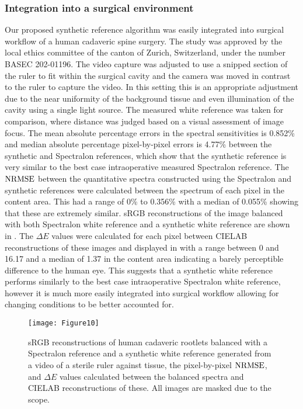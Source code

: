 \FloatBarrier
\subsubsection{Integration into a surgical environment}
\label{resultsintegration}
Our proposed synthetic reference algorithm was easily integrated into surgical workflow of a human cadaveric spine surgery. The study was approved by the local ethics committee of the canton of Zurich, Switzerland, under the number BASEC 202-01196. The video capture was adjusted to use a snipped section of the ruler to fit within the surgical cavity and the camera was moved in contrast to the ruler to capture the video. In this setting this is an appropriate adjustment due to the near uniformity of the background tissue and even illumination of the cavity using a single light source.
The measured white reference was taken for comparison, where distance was judged based on a visual assessment of image focus. The mean absolute percentage errors in the spectral sensitivities is 0.852\% and median absolute percentage pixel-by-pixel errors is 4.77\% between the synthetic and Spectralon references, which show that the synthetic reference is very similar to the best case intraoperative measured Spectralon reference. The $\operatorname{NRMSE}$ between the quantitative spectra constructed using the Spectralon and synthetic references were calculated between the spectrum of each pixel in the content area. This had a range of 0\% to 0.356\% with a median of 0.055\% showing that these are extremely similar. sRGB reconstructions of the image balanced with both Spectralon white reference and a synthetic white reference are shown in . The $\Delta E$ values were calculated for each pixel between CIELAB reconstructions of these images and displayed in  with a range between 0 and 16.17 and a median of 1.37 in the content area indicating a barely perceptible difference to the human eye. This suggests that a synthetic white reference performs similarly to the best case intraoperative Spectralon white reference, however it is much more easily integrated into surgical workflow allowing for changing conditions to be better accounted for. 

\begin{figure}[h!]
	\centering
	\texttt{[image: Figure10]}
	\caption{sRGB reconstructions of human cadaveric rootlets balanced with a Spectralon reference and a synthetic white reference generated from a video of a sterile ruler against tissue, the pixel-by-pixel $\operatorname{NRMSE}$, and $\Delta E$ values calculated between the balanced spectra and CIELAB reconstructions of these. All images are masked due to the scope.}
	\label{fig:ZurichRGB}
\end{figure}

